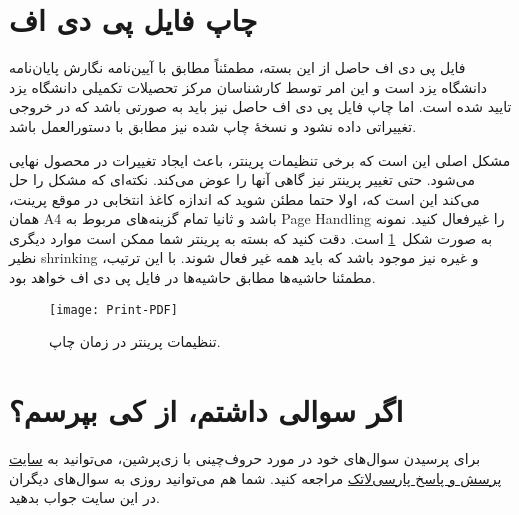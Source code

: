 \section{چاپ فایل پی دی اف}
فایل پی دی اف حاصل از این بسته، مطمئناً مطابق با آیین‌نامه نگارش پایان‌نامه دانشگاه یزد
است و این امر توسط کارشناسان مرکز تحصیلات تکمیلی دانشگاه یزد تایید شده است.
اما چاپ فایل پی دی اف حاصل نیز باید به صورتی باشد که در خروجی تغییراتی داده نشود و نسخۀ
چاپ شده نیز مطابق با دستورالعمل باشد. 

 مشکل اصلی این است که برخی تنظیمات پرینتر، باعث ایجاد تغییرات در محصول نهایی می‌شود.
  حتی تغییر پرینتر نیز گاهی آنها را عوض می‌کند. 
 نکته‌ای که مشکل را حل می‌کند این است که، اولا حتما مطئن شوید 
 که اندازه کاغذ انتخابی در موقع پرینت، همان A4 باشد و ثانیا تمام گزینه‌های مربوط 
 به Page Handling  را غیرفعال کنید. نمونه به صورت شکل~\ref{print} است.
دقت کنید که بسته به پرینتر شما ممکن است موارد دیگری نظیر shrinking  و غیره نیز 
موجود باشد که باید همه غیر فعال شوند.
با این ترتیب، مطمئنا حاشیه‌ها مطابق حاشیه‌ها در فایل پی دی اف خواهد بود.
\begin{figure}[!h]
 {\centerline{\texttt{[image: Print-PDF]}}}
 \caption{تنظیمات پرینتر در زمان چاپ.}\label{print}
 \end{figure}
\section{اگر سوالی داشتم، از کی بپرسم؟}
برای پرسیدن سوال‌های خود در مورد حروف‌چینی با زی‌پرشین،  می‌توانید به
 \href{http://qa.parsilatex.com}{سایت پرسش و پاسخ پارسی‌لاتک}%
مراجعه کنید. شما هم می‌توانید روزی به سوال‌های دیگران در این سایت جواب بدهید.
    
